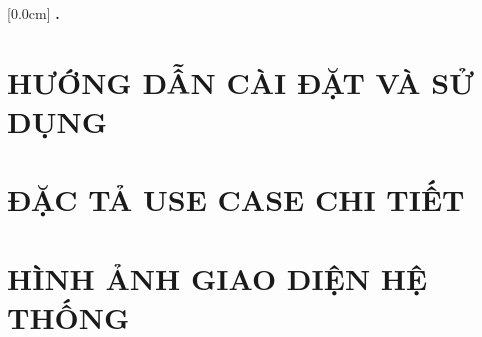 \documentclass[a4paper,12pt,twoside]{report} %
\theoremstyle{definition}
\begin{document}
    [0.0cm]             %
    {\bfseries\vspace{0.3cm}}                  %
    {{\bfseries \thecontentslabel.\ }} %
    {}         %
    {\contentspage} 
    
\chapter{HƯỚNG DẪN CÀI ĐẶT VÀ SỬ DỤNG}


\newpage
\chapter{ĐẶC TẢ USE CASE CHI TIẾT}


\newpage
\chapter{HÌNH ẢNH GIAO DIỆN HỆ THỐNG}

\end{document}
